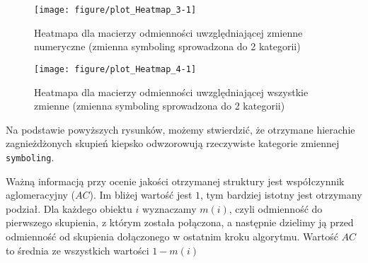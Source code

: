 \documentclass[12pt, a4paper]{article}\usepackage[]{graphicx}\usepackage[]{xcolor}
\makeatletter
\def\maxwidth{ %
  \ifdim\Gin@nat@width>\linewidth
    \linewidth
  \else
    \Gin@nat@width
  \fi
}
\newenvironment{knitrout}{}{} %
\makeatother
\begin{document}
\begin{knitrout}
\color{fgcolor}\begin{figure}[H]

{\centering \texttt{[image: figure/plot\_Heatmap\_3-1]} 

}

\caption[Heatmapa dla macierzy odmienności uwzględniającej zmienne numeryczne (zmienna symboling sprowadzona do 2 kategorii)]{Heatmapa dla macierzy odmienności uwzględniającej zmienne numeryczne (zmienna symboling sprowadzona do 2 kategorii)}\label{fig:plot_Heatmap_3}
\end{figure}

\end{knitrout}

\begin{knitrout}
\color{fgcolor}\begin{figure}[H]

{\centering \texttt{[image: figure/plot\_Heatmap\_4-1]} 

}

\caption[Heatmapa dla macierzy odmienności uwzględniającej wszystkie zmienne (zmienna symboling sprowadzona do 2 kategorii)]{Heatmapa dla macierzy odmienności uwzględniającej wszystkie zmienne (zmienna symboling sprowadzona do 2 kategorii)}\label{fig:plot_Heatmap_4}
\end{figure}

\end{knitrout}

Na podstawie powyższych rysunków, możemy stwierdzić, że otrzymane hierachie zagnieżdżonych skupień kiepsko odwzorowują rzeczywiste kategorie zmiennej \texttt{symboling}.
\par Ważną informacją przy ocenie jakości otrzymanej struktury jest współczynnik aglomeracyjny ($AC$). Im bliżej wartość jest $1$, tym bardziej istotny jest otrzymany podział. Dla każdego obiektu $i$ wyznaczamy $m(i)$, czyli odmienność do pierwszego skupienia, z którym została połączona, a następnie dzielimy ją przed odmienność od skupienia dołączonego w ostatnim kroku algorytmu. Wartość $AC$ to średnia ze wszystkich wartości $1-m(i)$
\end{document}
